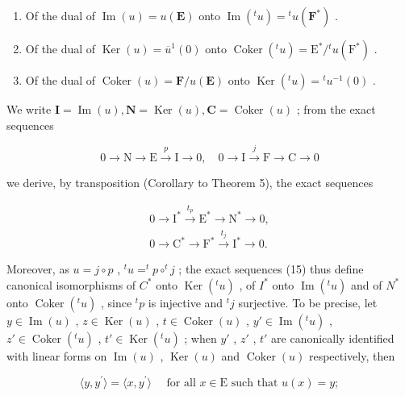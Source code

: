 \begin{enumerate}
\def\labelenumi{(\arabic{enumi})}
\item
  Of the dual of \(\operatorname{Im}(u) = u(\mathbf{E})\) onto \(\operatorname{Im}(^t u) = {}^t u(\mathbf{F}^*)\) .
\item
  Of the dual of \(\operatorname{Ker}(u) = \overline{u}^1(0)\) onto \(\operatorname{Coker}(^t u) = \mathrm{E}^* / {}^t u(\mathrm{F}^*)\) .
\item
  Of the dual of \(\operatorname{Coker}(u) = \mathbf{F} / u(\mathbf{E})\) onto \(\operatorname{Ker}(^t u) = {}^t u^{-1}(0)\) .
\end{enumerate}

We write \(\mathbf{I} = \operatorname{Im}(u),\mathbf{N} = \operatorname{Ker}(u),\mathbf{C} = \operatorname{Coker}(u)\) ; from the exact sequences

\[
0 \longrightarrow \mathrm{N} \longrightarrow \mathrm{E} \stackrel {p} {\longrightarrow} \mathrm{I} \longrightarrow 0, \quad 0 \longrightarrow \mathrm{I} \stackrel {j} {\longrightarrow} \mathrm{F} \longrightarrow \mathrm{C} \longrightarrow 0 \tag {14}
\]

we derive, by transposition (Corollary to Theorem 5), the exact sequences

\[
\begin{array}{l} 0 \longrightarrow \mathrm{I} ^ {*} \stackrel {{t _ {p}}} {{\longrightarrow}} \mathrm{E} ^ {*} \longrightarrow \mathrm{N} ^ {*} \longrightarrow 0, \\ 0 \longrightarrow \mathrm{C} ^ {*} \longrightarrow \mathrm{F} ^ {*} \stackrel {{t _ {j}}} {{\longrightarrow}} \mathrm{I} ^ {*} \longrightarrow 0. \end{array}\tag{15}
\]

Moreover, as \(u = j \circ p\) , \(^{t}u = ^{t}p \circ ^{t}j\) ; the exact sequences (15) thus define canonical isomorphisms of \(C^*\) onto \(\operatorname{Ker}(^{t}u)\) , of \(I^*\) onto \(\operatorname{Im}(^{t}u)\) and of \(N^*\) onto \(\operatorname{Coker}(^{t}u)\) , since \(^{t}p\) is injective and \(^{t}j\) surjective. To be precise, let \(y \in \operatorname{Im}(u)\) , \(z \in \operatorname{Ker}(u)\) , \(t \in \operatorname{Coker}(u)\) , \(y' \in \operatorname{Im}(^{t}u)\) , \(z' \in \operatorname{Coker}(^{t}u)\) , \(t' \in \operatorname{Ker}(^{t}u)\) ; when \(y'\) , \(z'\) , \(t'\) are canonically identified with linear forms on \(\operatorname{Im}(u)\) , \(\operatorname{Ker}(u)\) and \(\operatorname{Coker}(u)\) respectively, then

\[
\langle y, y ^ {\prime} \rangle = \langle x, y ^ {\prime} \rangle \quad \text { for   all } x \in \mathrm{E} \text { such   that } u (x) = y;\tag{16}
\]

